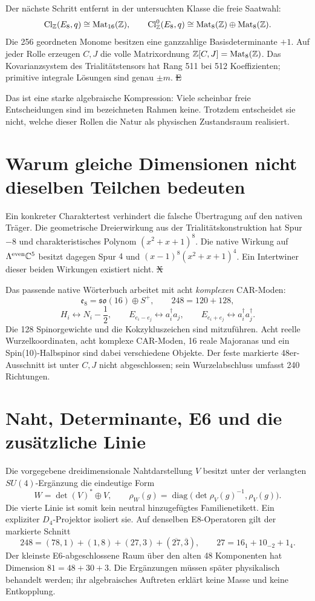 Der nächste Schritt entfernt in der untersuchten Klasse die freie Saatwahl:
\[
 \mathrm{Cl}_{\mathbb Z}(E_8,q)\cong\mathrm{Mat}_{16}(\mathbb Z),\qquad
 \mathrm{Cl}_{\mathbb Z}^{0}(E_8,q)\cong
 \mathrm{Mat}_8(\mathbb Z)\oplus\mathrm{Mat}_8(\mathbb Z).
\]
Die 256 geordneten Monome besitzen eine ganzzahlige Basisdeterminante $+1$. Auf jeder Rolle erzeugen $C,J$ die volle Matrixordnung $\mathbb Z[C,J]=\mathrm{Mat}_8(\mathbb Z)$. Das Kovarianzsystem des Trialitätstensors hat Rang 511 bei 512 Koeffizienten; primitive integrale Lösungen sind genau $\pm m$. \st{E} 

Das ist eine starke algebraische Kompression: Viele scheinbar freie Entscheidungen sind im bezeichneten Rahmen keine. Trotzdem entscheidet sie nicht, welche dieser Rollen die Natur als physischen Zustandsraum realisiert.

\section{Warum gleiche Dimensionen nicht dieselben Teilchen bedeuten}
Ein konkreter Charaktertest verhindert die falsche Übertragung auf den nativen Träger. Die geometrische Dreierwirkung aus der Trialitätskonstruktion hat Spur $-8$ und charakteristisches Polynom $(x^2+x+1)^8$. Die native Wirkung auf $\Lambda^{\mathrm{even}}\mathbb C^5$ besitzt dagegen Spur $4$ und $(x-1)^8(x^2+x+1)^4$. Ein Intertwiner dieser beiden Wirkungen existiert nicht. \st{X} 

Das passende native Wörterbuch arbeitet mit acht \emph{komplexen} CAR-Moden:
\[
 \mathfrak e_8=\mathfrak{so}(16)\oplus S^+,
 \qquad248=120+128,
\]
\[
 H_i\leftrightarrow N_i-\frac12,\qquad
 E_{e_i-e_j}\leftrightarrow a_i^\dagger a_j,\qquad
 E_{e_i+e_j}\leftrightarrow a_i^\dagger a_j^\dagger.
\]
Die 128 Spinorgewichte und die Kokzykluszeichen sind mitzuführen. Acht reelle Wurzelkoordinaten, acht komplexe CAR-Moden, 16 reale Majoranas und ein Spin(10)-Halbspinor sind dabei verschiedene Objekte. Der feste markierte 48er-Ausschnitt ist unter $C,J$ nicht abgeschlossen; sein Wurzelabschluss umfasst 240 Richtungen. 

\section{Naht, Determinante, E6 und die zusätzliche Linie}
Die vorgegebene dreidimensionale Nahtdarstellung $V$ besitzt unter der verlangten $SU(4)$-Ergänzung die eindeutige Form
\[
 W=\det(V)^*\oplus V,\qquad
 \rho_W(g)=\operatorname{diag}\bigl(\det\rho_V(g)^{-1},\rho_V(g)\bigr).
\]
Die vierte Linie ist somit kein neutral hinzugefügtes Familienetikett. Ein expliziter $D_4$-Projektor isoliert sie. Auf denselben E8-Operatoren gilt der markierte Schnitt
\[
 248=(78,1)+(1,8)+(27,3)+(\overline{27},\overline3),\qquad
 27=16_1+10_{-2}+1_4.
\]
Der kleinste E6-abgeschlossene Raum über den alten 48 Komponenten hat Dimension $81=48+30+3$. Die Ergänzungen müssen später physikalisch behandelt werden; ihr algebraisches Auftreten erklärt keine Masse und keine Entkopplung. 

